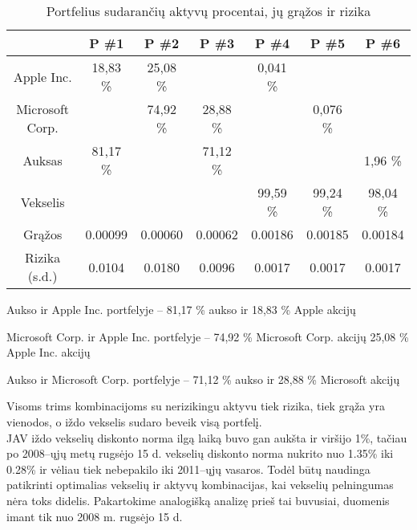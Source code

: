\documentclass[12pt, a14paper, lithuanian]{article}
\begin{document}
\begin{table}[ht]
\begin{center}
\begin{tabular}{ccccccc}
  \hline
 & P \#1 & P \#2 & P \#3 & P \#4 & P \#5 & P \#6 \\ 
  \hline
Apple Inc. & 18,83 \% & 25,08 \% &  & 0,041 \%  & & &\\
\hline
 Microsoft Corp. &  & 74,92 \% & 28,88 \% & & 0,076 \% & & \\ 
   \hline
   Auksas & 81,17 \% & & 71,12 \% & & & 1,96 \% & \\
   \hline
   Vekselis & & & & 99,59 \% & 99,24 \% & 98,04 \% & \\
   \hline
   Grąžos & 0.00099 & 0.00060 & 0.00062 & 0.00186 & 0.00185 & 0.00184 &\\
   \hline
   Rizika (s.d.) & 0.0104 & 0.0180 & 0.0096 & 0.0017 & 0.0017 & 0.0017 &\\
   \hline
\end{tabular}
\end{center}
\caption{Portfelius sudarančių aktyvų procentai, jų grąžos ir rizika}
\end{table}

Aukso ir Apple Inc. portfelyje -- 81,17 \% aukso ir 18,83 \% Apple akcijų

Microsoft Corp. ir Apple Inc. portfelyje -- 74,92 \% Microsoft Corp. akcijų  25,08 \% Apple Inc. akcijų

Aukso ir Microsoft Corp. portfelyje -- 71,12 \% aukso ir 28,88 \% Microsoft akcijų

Visoms trims kombinacijoms su nerizikingu aktyvu tiek rizika, tiek grąža yra vienodos, o iždo vekselis sudaro beveik visą portfelį. \\



JAV iždo vekselių diskonto norma ilgą laiką buvo gan aukšta ir viršijo 1\%, tačiau
po 2008--ųjų metų rugsėjo 15 d. vekselių diskonto norma nukrito nuo 1.35\% iki 0.28\% ir vėliau tiek nebepakilo iki 2011--ųjų
vasaros. Todėl būtų naudinga patikrinti optimalias vekselių ir aktyvų kombinacijas, kai vekselių pelningumas
nėra toks didelis. Pakartokime analogišką analizę prieš tai buvusiai, duomenis imant tik nuo 2008 m. rugsėjo 15 d. 
\end{document}
